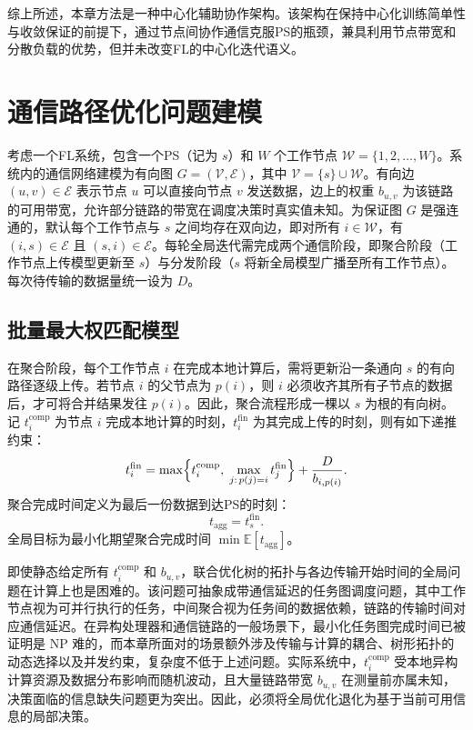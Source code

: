 \documentclass[master, vlined]{DissertUESTC}
\begin{document}
	综上所述，本章方法是一种中心化辅助协作架构。该架构在保持中心化训练简单性与收敛保证的前提下，通过节点间协作通信克服PS的瓶颈，兼具利用节点带宽和分散负载的优势，但并未改变FL的中心化迭代语义。

	\section{通信路径优化问题建模}
	\label{sec:scheduling-challenge}

	考虑一个FL系统，包含一个PS（记为 $s$）和 $W$ 个工作节点 $\mathcal{W}=\{1,2,\dots,W\}$。系统内的通信网络建模为有向图 $G=(\mathcal{V},\mathcal{E})$，其中 $\mathcal{V}=\{s\}\cup\mathcal{W}$。有向边 $(u,v)\in\mathcal{E}$ 表示节点 $u$ 可以直接向节点 $v$ 发送数据，边上的权重 $b_{u,v}$ 为该链路的可用带宽，允许部分链路的带宽在调度决策时真实值未知。为保证图 $G$ 是强连通的，默认每个工作节点与 $s$ 之间均存在双向边，即对所有 $i\in\mathcal{W}$，有 $(i,s)\in\mathcal{E}$ 且 $(s,i)\in\mathcal{E}$。每轮全局迭代需完成两个通信阶段，即聚合阶段（工作节点上传模型更新至 $s$）与分发阶段（$s$ 将新全局模型广播至所有工作节点）。每次待传输的数据量统一设为 $D$。

	\subsection{批量最大权匹配模型}

	在聚合阶段，每个工作节点 $i$ 在完成本地计算后，需将更新沿一条通向 $s$ 的有向路径逐级上传。若节点 $i$ 的父节点为 $p(i)$，则 $i$ 必须收齐其所有子节点的数据后，才可将合并结果发往 $p(i)$。因此，聚合流程形成一棵以 $s$ 为根的有向树。记 $t_i^{\text{comp}}$ 为节点 $i$ 完成本地计算的时刻，$t_i^{\text{fin}}$ 为其完成上传的时刻，则有如下递推约束：
	\begin{equation}
	t_i^{\text{fin}} = \max\Bigl\{t_i^{\text{comp}},\; \max_{j:\,p(j)=i} t_j^{\text{fin}}\Bigr\} + \frac{D}{b_{i,p(i)}}.
	\end{equation}
	聚合完成时间定义为最后一份数据到达PS的时刻：
	\begin{equation}
	t_{\text{agg}} = t_s^{\text{fin}}.
	\end{equation}
	全局目标为最小化期望聚合完成时间 $\min \mathbb{E}[t_{\text{agg}}]$。

	即使静态给定所有 $t_i^{\text{comp}}$ 和 $b_{u,v}$，联合优化树的拓扑与各边传输开始时间的全局问题在计算上也是困难的。该问题可抽象成带通信延迟的任务图调度问题，其中工作节点视为可并行执行的任务，中间聚合视为任务间的数据依赖，链路的传输时间对应通信延迟。在异构处理器和通信链路的一般场景下，最小化任务图完成时间已被证明是 NP 难的，而本章所面对的场景额外涉及传输与计算的耦合、树形拓扑的动态选择以及并发约束，复杂度不低于上述问题。实际系统中，$t_i^{\text{comp}}$ 受本地异构计算资源及数据分布影响而随机波动，且大量链路带宽 $b_{u,v}$ 在测量前亦属未知，决策面临的信息缺失问题更为突出。因此，必须将全局优化退化为基于当前可用信息的局部决策。
\end{document}
